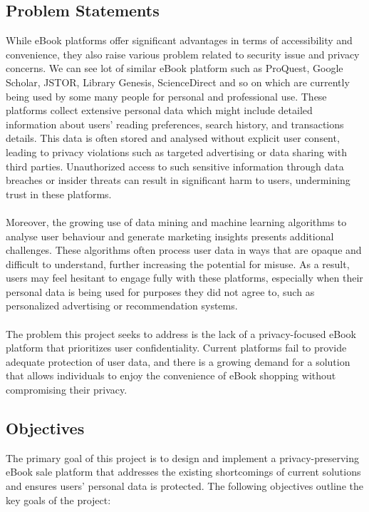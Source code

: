 \documentclass[12pt]{article}
\begin{document}
\subsection{Problem Statements}
While eBook platforms offer significant advantages in terms of accessibility and convenience, they also raise various problem related to security issue and privacy concerns. We can see lot of similar eBook platform such as ProQuest, Google Scholar, JSTOR, Library Genesis, ScienceDirect and so on which are currently being used by some many people for personal and professional use. These platforms collect extensive personal data which might include detailed information about users’ reading preferences, search history, and transactions details. This data is often stored and analysed without explicit user consent, leading to privacy violations such as targeted advertising or data sharing with third parties. Unauthorized access to such sensitive information through data breaches or insider threats can result in significant harm to users, undermining trust in these platforms.~\cite{Springer2023}\\\\

Moreover, the growing use of data mining and machine learning algorithms to analyse user behaviour and generate marketing insights presents additional challenges. These algorithms often process user data in ways that are opaque and difficult to understand, further increasing the potential for misuse. As a result, users may feel hesitant to engage fully with these platforms, especially when their personal data is being used for purposes they did not agree to, such as personalized advertising or recommendation systems.\\\\

The problem this project seeks to address is the lack of a privacy-focused eBook platform that prioritizes user confidentiality. Current platforms fail to provide adequate protection of user data, and there is a growing demand for a solution that allows individuals to enjoy the convenience of eBook shopping without compromising their privacy.
~\cite{Pew2023}
\subsection{Objectives}
The primary goal of this project is to design and implement a privacy-preserving eBook sale platform that addresses the existing shortcomings of current solutions and ensures users' personal data is protected. The following objectives outline the key goals of the project:
\end{document}
